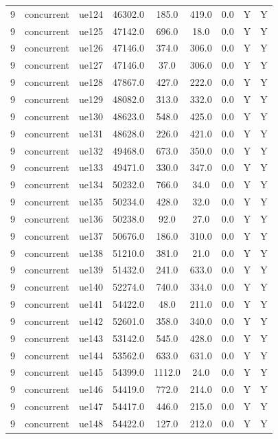\begin{table}[ht]
\begin{tabular}{|c|c|c|c|c|c|c|c|c|}
9 & concurrent & ue124 & 46302.0 & 185.0 & 419.0 & 0.0 & Y & Y \\
9 & concurrent & ue125 & 47142.0 & 696.0 & 18.0 & 0.0 & Y & Y \\
9 & concurrent & ue126 & 47146.0 & 374.0 & 306.0 & 0.0 & Y & Y \\
9 & concurrent & ue127 & 47146.0 & 37.0 & 306.0 & 0.0 & Y & Y \\
9 & concurrent & ue128 & 47867.0 & 427.0 & 222.0 & 0.0 & Y & Y \\
9 & concurrent & ue129 & 48082.0 & 313.0 & 332.0 & 0.0 & Y & Y \\
9 & concurrent & ue130 & 48623.0 & 548.0 & 425.0 & 0.0 & Y & Y \\
9 & concurrent & ue131 & 48628.0 & 226.0 & 421.0 & 0.0 & Y & Y \\
9 & concurrent & ue132 & 49468.0 & 673.0 & 350.0 & 0.0 & Y & Y \\
9 & concurrent & ue133 & 49471.0 & 330.0 & 347.0 & 0.0 & Y & Y \\
9 & concurrent & ue134 & 50232.0 & 766.0 & 34.0 & 0.0 & Y & Y \\
9 & concurrent & ue135 & 50234.0 & 428.0 & 32.0 & 0.0 & Y & Y \\
9 & concurrent & ue136 & 50238.0 & 92.0 & 27.0 & 0.0 & Y & Y \\
9 & concurrent & ue137 & 50676.0 & 186.0 & 310.0 & 0.0 & Y & Y \\
9 & concurrent & ue138 & 51210.0 & 381.0 & 21.0 & 0.0 & Y & Y \\
9 & concurrent & ue139 & 51432.0 & 241.0 & 633.0 & 0.0 & Y & Y \\
9 & concurrent & ue140 & 52274.0 & 740.0 & 334.0 & 0.0 & Y & Y \\
9 & concurrent & ue141 & 54422.0 & 48.0 & 211.0 & 0.0 & Y & Y \\
9 & concurrent & ue142 & 52601.0 & 358.0 & 340.0 & 0.0 & Y & Y \\
9 & concurrent & ue143 & 53142.0 & 545.0 & 428.0 & 0.0 & Y & Y \\
9 & concurrent & ue144 & 53562.0 & 633.0 & 631.0 & 0.0 & Y & Y \\
9 & concurrent & ue145 & 54399.0 & 1112.0 & 24.0 & 0.0 & Y & Y \\
9 & concurrent & ue146 & 54419.0 & 772.0 & 214.0 & 0.0 & Y & Y \\
9 & concurrent & ue147 & 54417.0 & 446.0 & 215.0 & 0.0 & Y & Y \\
9 & concurrent & ue148 & 54422.0 & 127.0 & 212.0 & 0.0 & Y & Y \\

\end{tabular}
\end{table}
